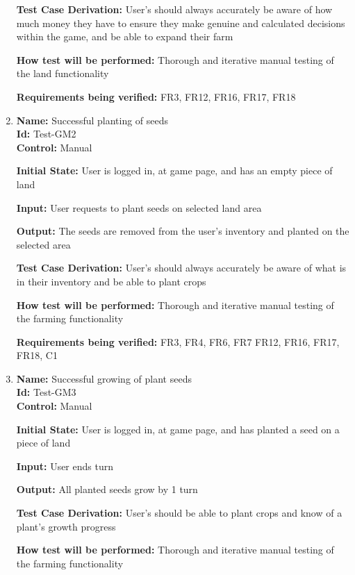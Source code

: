 \documentclass[12pt, titlepage]{article}
\begin{document}
\begin{enumerate}
\textbf{Test Case Derivation:} User's should always accurately be aware of how much money they have to ensure they make genuine and calculated decisions within the game, and be able to expand their farm

\textbf{How test will be performed:} Thorough and iterative manual testing of the land functionality

\textbf{Requirements being verified:} FR3, FR12, FR16, FR17, FR18

\item{\textbf{Name:} Successful planting of seeds\\} %
\textbf{Id:} Test-GM2 \label{Test-GM2}\\

\textbf{Control:} Manual
					
\textbf{Initial State:} User is logged in, at game page, and has an empty piece of land
					
\textbf{Input: }User requests to plant seeds on selected land area
					
\textbf{Output:} The seeds are removed from the user's inventory and planted on the selected area

\textbf{Test Case Derivation:} User's should always accurately be aware of what is in their inventory and be able to plant crops

\textbf{How test will be performed: }Thorough and iterative manual testing of the farming functionality

\textbf{Requirements being verified:} FR3, FR4, FR6, FR7 FR12, FR16, FR17, FR18, C1

\item{\textbf{Name:} Successful growing of plant seeds\\} %
\textbf{Id:} Test-GM3 \label{Test-GM3}\\

\textbf{Control:} Manual
					
\textbf{Initial State:} User is logged in, at game page, and has planted a seed on a piece of land
					
\textbf{Input:} User ends turn
					
\textbf{Output:} All planted seeds grow by 1 turn

\textbf{Test Case Derivation:} User's should be able to plant crops and know of a plant's growth progress

\textbf{How test will be performed:} Thorough and iterative manual testing of the farming functionality


\end{enumerate}
\end{document}
